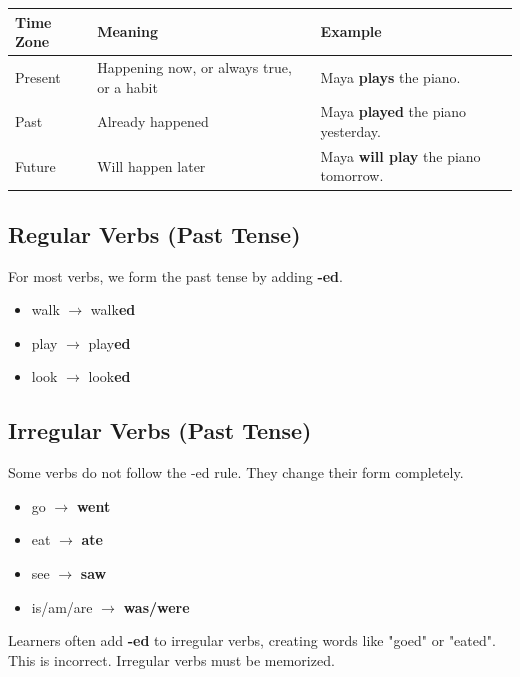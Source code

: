 \begin{table}[h!]
\centering
\begin{tabular}{|l|l|l|}
\hline
\textbf{Time Zone} & \textbf{Meaning} & \textbf{Example} \\
\hline
Present & Happening now, or always true, or a habit & Maya \textbf{plays} the piano. \\
Past & Already happened & Maya \textbf{played} the piano yesterday. \\
Future & Will happen later & Maya \textbf{will play} the piano tomorrow. \\
\hline
\end{tabular}
\end{table}

\subsection*{Regular Verbs (Past Tense)}
For most verbs, we form the past tense by adding \textbf{-ed}.
\begin{itemize}
    \item walk \(\rightarrow\) walk\textbf{ed}
    \item play \(\rightarrow\) play\textbf{ed}
    \item look \(\rightarrow\) look\textbf{ed}
\end{itemize}

\subsection*{Irregular Verbs (Past Tense)}
Some verbs do not follow the -ed rule. They change their form completely.
\begin{itemize}
    \item go \(\rightarrow\) \textbf{went}
    \item eat \(\rightarrow\) \textbf{ate}
    \item see \(\rightarrow\) \textbf{saw}
    \item is/am/are \(\rightarrow\) \textbf{was/were}
\end{itemize}

\begin{warningbox}
    Learners often add \textbf{-ed} to irregular verbs, creating words like "goed" or "eated". This is incorrect. Irregular verbs must be memorized.
\end{warningbox}

